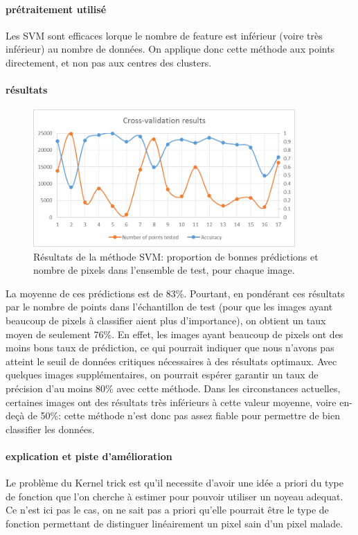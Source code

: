\documentclass[a4paper,10pt]{report}
\begin{document}
\paragraph{prétraitement utilisé}
Les SVM sont efficaces lorque le nombre de feature est inférieur (voire très inférieur) au nombre de données. On applique donc cette méthode aux points directement, et non pas aux centres des clusters.

\paragraph{résultats}
\begin{figure}[htbp]
  \caption{Résultats de la méthode SVM: proportion de bonnes prédictions et nombre de pixels dans l'ensemble de test, pour chaque image.}
  \centering
  \includegraphics[width=10cm]{SVM_CV.png}
\end{figure}

La moyenne de ces prédictions est de 83\%.
Pourtant, en pondérant ces résultats par le nombre de points dans l'échantillon de test (pour que les images ayant beaucoup de pixels à classifier aient plus d'importance), on obtient un taux moyen de seulement 76\%. En effet, les images ayant beaucoup de pixels ont des moins bons taux de prédiction, ce qui pourrait indiquer que nous n'avons pas atteint le seuil de données critiques nécessaires à des résultats optimaux. Avec quelques images supplémentaires, on pourrait espérer garantir un taux de précision d'au moins 80\% avec cette méthode. 
Dans les circonstances actuelles, certaines images ont des résultats très inférieurs à cette valeur moyenne, voire en-deçà de 50\%: cette méthode n'est donc pas assez fiable pour permettre de bien classifier les données.

\paragraph{explication et piste d'amélioration}
Le problème du Kernel trick est qu'il necessite d'avoir une idée a priori du type de fonction que l'on cherche à estimer pour pouvoir utiliser un noyeau adequat. Ce n'est ici pas le cas, on ne sait pas a priori qu'elle pourrait être le type de fonction permettant de distinguer linéairement un pixel sain d'un pixel malade.
\end{document}
